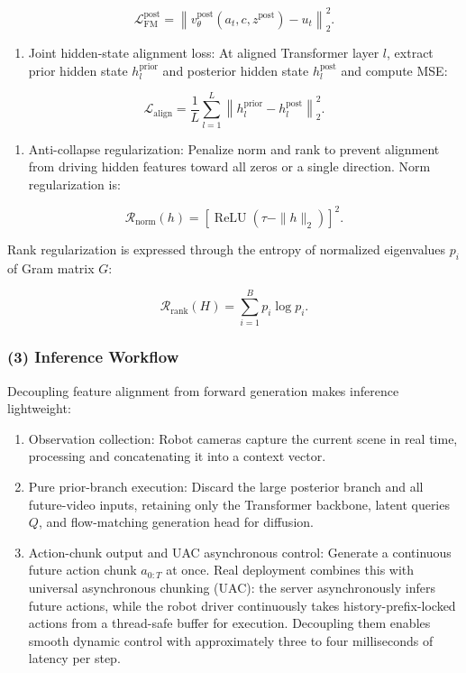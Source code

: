 \[
\mathcal{L}_{\mathrm{FM}}^{\mathrm{post}}=\left\|v_\theta^{\mathrm{post}}(a_t,c,z^{\mathrm{post}})-u_t\right\|_2^2.
\]

\begin{enumerate}
\def\labelenumi{\arabic{enumi}.}
\setcounter{enumi}{1}
\tightlist
\item
{}
  Joint hidden-state alignment loss: At aligned Transformer layer \(l\), extract prior hidden state \(h_l^{\mathrm{prior}}\) and posterior hidden state \(h_l^{\mathrm{post}}\) and compute MSE:
\end{enumerate}

\[
\mathcal{L}_{\mathrm{align}}=\frac{1}{L}\sum_{l=1}^{L}\left\|h_l^{\mathrm{prior}}-h_l^{\mathrm{post}}\right\|_2^2.
\]

\begin{enumerate}
\def\labelenumi{\arabic{enumi}.}
\setcounter{enumi}{2}
\tightlist
\item
{}
  Anti-collapse regularization: Penalize norm and rank to prevent alignment from driving hidden features toward all zeros or a single direction. Norm regularization is:
\end{enumerate}

\[
\mathcal{R}_{\mathrm{norm}}(h)=\left[\operatorname{ReLU}\!\left(\tau-\|h\|_2\right)\right]^2.
\]

Rank regularization is expressed through the entropy of normalized eigenvalues \(p_i\) of Gram matrix \(G\):

\[
\mathcal{R}_{\mathrm{rank}}(H)=\sum_{i=1}^{B}p_i\log p_i.
\]

\hypertarget{inference-workflow-3}{%
\subsubsection{(3) Inference Workflow}\label{inference-workflow-3}}

Decoupling feature alignment from forward generation makes inference lightweight:

\begin{enumerate}
\def\labelenumi{\arabic{enumi}.}
\tightlist
\item
  Observation collection: Robot cameras capture the current scene in real time, processing and concatenating it into a context vector.
\item
  Pure prior-branch execution: Discard the large posterior branch and all future-video inputs, retaining only the Transformer backbone, latent queries \(Q\), and flow-matching generation head for diffusion.
\item
  Action-chunk output and UAC asynchronous control: Generate a continuous future action chunk \(a_{0:T}\) at once. Real deployment combines this with universal asynchronous chunking (UAC): the server asynchronously infers future actions, while the robot driver continuously takes history-prefix-locked actions from a thread-safe buffer for execution. Decoupling them enables smooth dynamic control with approximately three to four milliseconds of latency per step.
\end{enumerate}


